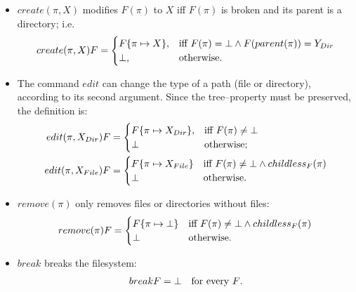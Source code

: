 \begin{notrsi}
\begin{itemize}
\item
\(create(\pi,X)\) modifies \(F(\pi)\) to \(X\) iff
\(F(\pi)\) is broken and its parent is a directory; i.e.
\[create(\pi,X)F=
\begin{cases}
F\{\pi\mapsto X\}, &\mbox{iff~} F(\pi)=\bot
\wedge F(parent(\pi))=Y_{Dir}\\
\bot, &\mbox{otherwise.}
\end{cases}\]
\item
The command \(edit\) can change the type of a path (file or
directory), according to its second argument.
Since the tree--property must be preserved, the definition is:
\begin{align*}
edit(\pi,X_{Dir})F&=
\begin{cases}
F\{\pi\mapsto X_{Dir}\}, &\mbox{iff~}
F(\pi)\neq\bot\\
\bot &\mbox{otherwise;}
\end{cases}\\
edit(\pi,X_{File})F&=
\begin{cases}
F\{\pi\mapsto X_{File}\} &\mbox{iff~}
F(\pi)\neq\bot\wedge childless_F(\pi)\\
\bot &\mbox{otherwise.}
\end{cases}
\end{align*}
\item
\(remove(\pi)\) only removes files or directories without files:
\[remove(\pi)F=
\begin{cases}  
F\{\pi\mapsto\bot\} &\mbox{iff~}
F(\pi)\neq\bot \wedge childless_F(\pi)\\
\bot &\mbox{otherwise.}
\end{cases}\]
\item
\(break\) breaks the filesystem:
\[\begin{array}{r@{}ll}
breakF&{}=\ud &\mbox{for every $F$.}\end{array}\]
\end{itemize}
\end{notrsi}
%
